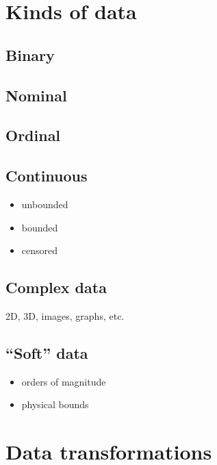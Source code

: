 \documentclass[]{book}
\begin{document}
\hypertarget{kinds-of-data}{%
\section{Kinds of data}\label{kinds-of-data}}

\hypertarget{binary}{%
\subsection{Binary}\label{binary}}

\hypertarget{nominal}{%
\subsection{Nominal}\label{nominal}}

\hypertarget{ordinal}{%
\subsection{Ordinal}\label{ordinal}}

\hypertarget{continuous}{%
\subsection{Continuous}\label{continuous}}

\begin{itemize}
\item
  unbounded
\item
  bounded
\item
  censored
\end{itemize}

\hypertarget{complex-data}{%
\subsection{Complex data}\label{complex-data}}

2D, 3D, images, graphs, etc.

\hypertarget{soft-data}{%
\subsection{``Soft'' data}\label{soft-data}}

\begin{itemize}
\item
  orders of magnitude
\item
  physical bounds
\end{itemize}

\hypertarget{data-transformations}{%
\section{Data transformations}\label{data-transformations}}
\end{document}
